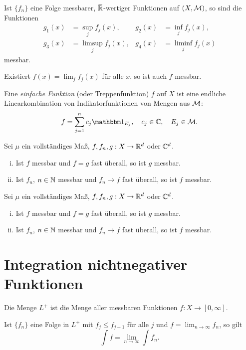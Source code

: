 \documentclass[
 a4paper,
 10pt,
 parskip=half
 ]{scrartcl}
\theoremstyle{plain}
\theoremstyle{definition}
\numberwithin{equation}{section}
\begin{document}
\begin{lem}
 Ist $\{f_n\}$ eine Folge messbarer, $\realext$-wertiger Funktionen auf $(X, \mathcal{M})$, so sind die Funktionen 
 \begin{align*}
  g_1(x) &= \sup_j f_j(x), & g_2(x) &= \inf_j f_j(x), \\
  g_3(x) &= \limsup_{j} f_j(x), & g_4(x) &= \liminf_j f_j(x)
 \end{align*}
 messbar.
 
 Existiert $f(x) = \lim_j f_j(x)$ für alle $x$, so ist auch $f$ messbar.
\end{lem}

Eine \emph{einfache Funktion} (oder Treppenfunktion) $f$ auf $X$ ist eine endliche Linearkombination von Indikatorfunktionen von Mengen aus $\mathcal{M}$: 
  \[ f = \sum_{j=1}^n c_j \ind_{E_j}, \quad c_j \in \complex, \quad E_j \in
    \meas. \]
  
\begin{lem}
 Sei $\mu$ ein vollständiges Maß, $f,f_n,g: X \to \mathbb{R}^d$ oder $\mathbb{C}^d$.
 \begin{enumerate}[(i)]
  \item Ist $f$ messbar und $f=g$ fast überall, so ist $g$ messbar.
  \item Ist $f_n$, $n \in \mathbb{N}$ messbar und $f_n \to f$ fast überall, so ist $f$ messbar.
 \end{enumerate}
\end{lem}

\begin{lem}
 Sei $\mu$ ein vollständiges Maß, $f,f_n,g: X \to \mathbb{R}^d$ oder $\mathbb{C}^d$.
 \begin{enumerate}[(i)]
  \item Ist $f$ messbar und $f=g$ fast überall, so ist $g$ messbar.
  \item Ist $f_n$, $n \in \mathbb{N}$ messbar und $f_n \to f$ fast überall, so ist $f$ messbar.
 \end{enumerate}
\end{lem}

\section*{Integration nichtnegativer Funktionen}
Die Menge $L^+$ ist die Menge aller messbaren Funktionen $f:X \to [0, \infty]$.

\begin{thm}
 Ist $\{f_n\}$ eine Folge in $L^+$ mit $f_j \le f_{j+1}$ für alle $j$ und $f = \lim_{n \to \infty} f_n$, so gilt
 \[ \int f = \lim_{n \to \infty} \int f_n. \]
\end{thm}
\end{document}
